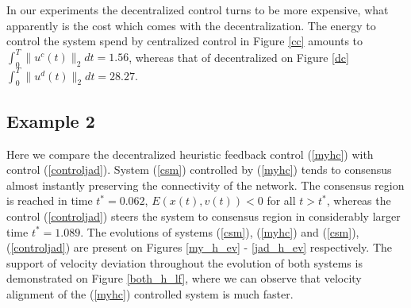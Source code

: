 \documentclass[a4paper,10pt, english]{article}
\begin{document}
In our experiments the decentralized control turns to be more expensive, what apparently is the cost which comes with the decentralization. 
The energy to control the system spend by centralized control in Figure \ref{cc} amounts to  $\int_{0}^{T} \|u^c(t)\|_2 dt  = 1.56$, whereas that of decentralized on Figure \ref{dc} $\int_{0}^{T} \|u^d(t)\|_2 dt  = 28.27$.



 \subsection{Example 2}
  Here we compare the decentralized heuristic feedback control (\ref{myhc}) with control (\ref{controljad}).
System (\ref{csm}) controlled by (\ref{myhc}) tends to consensus almost instantly preserving the connectivity of the network. The consensus region is reached 
  in time   $t^* = 0.062$,  $E(x(t), v(t)) < 0$ for all $t>t^{*}$, whereas the control (\ref{controljad}) steers the system to consensus region in considerably larger time  $t^* = 1.089$.
  The evolutions of systems (\ref{csm}), (\ref{myhc}) and (\ref{csm}), (\ref{controljad}) are present on Figures \ref{my_h_ev} - \ref{jad_h_ev} respectively.
  The support of velocity deviation throughout the evolution of both systems is demonstrated on Figure \ref{both_h_lf}, where we can observe that velocity alignment of the (\ref{myhc}) controlled system is much faster.
\end{document}
